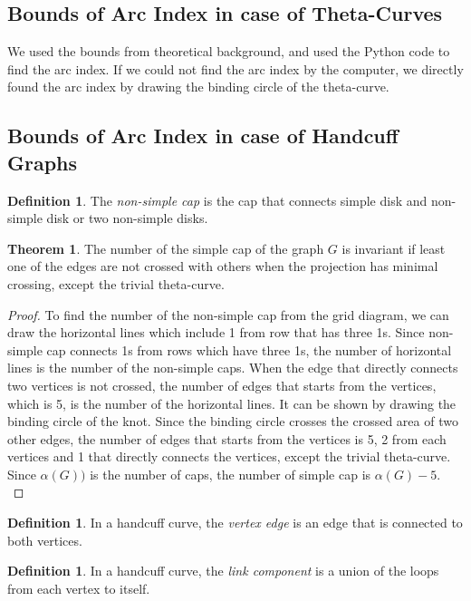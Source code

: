 \documentclass{article}
\theoremstyle{definition}
\newtheorem{defn}[thm]{Definition}
\theoremstyle{theorem}
\newtheorem{theorem}{Theorem}
\theoremstyle{proposition}
\theoremstyle{corollary}
\begin{document}
\subsection{Bounds of Arc Index in case of Theta-Curves}
We used the bounds from theoretical background, and used the Python code to find the arc index. If we could not find the arc index by the computer, we directly found the arc index by drawing the binding circle of the theta-curve.

\subsection{Bounds of Arc Index in case of Handcuff Graphs}

\begin{defn}
    The \textit{non-simple cap} is the cap that connects simple disk and non-simple disk or two non-simple disks.
\end{defn}

\begin{theorem}
The number of the simple cap of the graph $G$ is invariant if least one of the edges are not crossed with others when the projection has minimal crossing, except the trivial theta-curve.
\end{theorem}
\begin{proof}
     To find the number of the non-simple cap from the grid diagram, we can draw the horizontal lines which include 1 from row that has three 1s. Since non-simple cap connects 1s from rows which have three 1s, the number of horizontal lines is the number of the non-simple caps. When the edge that directly connects two vertices is not crossed, the number of edges that starts from the vertices, which is 5, is the number of the horizontal lines. It can be shown by drawing the binding circle of the knot. Since the binding circle crosses the crossed area of two other edges, the number of edges that starts from the vertices is 5, 2 from each vertices and 1 that directly connects the vertices, except the trivial theta-curve. Since $\alpha(G))$ is the number of caps, the number of simple cap is $\alpha(G) - 5$.\\
\end{proof}

\begin{defn}
    In a handcuff curve, the \textit{vertex edge} is an edge that is connected to both vertices.
\end{defn}

\begin{defn}
    In a handcuff curve, the \textit{link component} is a union of the loops from each vertex to itself.
\end{defn}
\end{document}
